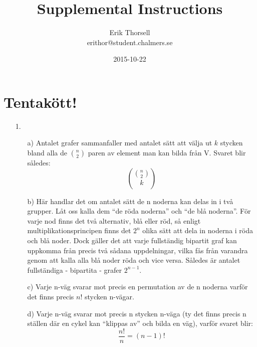 \documentclass{article}
\title{Supplemental Instructions}
\author{Erik Thorsell \\ 
		\small{erithor@student.chalmers.se}
}
\date{2015-10-22}
\begin{document}
\maketitle

\section*{Tentakött!}

\begin{enumerate}

\item[1.]
\begin{itemize}
    \item[a)] Antalet grafer sammanfaller med antalet sätt att välja ut $k$ 
              stycken bland alla de $\binom{n}{2}$ paren av element man kan
              bilda från V. Svaret blir således: $$\binom{\binom{n}{2}}{k}$$
    \item[b)] Här handlar det om antalet sätt de n noderna kan delas in i två
              grupper. Låt oss kalla dem ``de röda noderna'' och ``de blå
              noderna''. För varje nod finns det två alternativ, blå eller röd,
              så enligt multiplikationsprincipen finns det $2^n$ olika sätt att
              dela in noderna i röda och blå noder. Dock gäller det att varje
              fullständig bipartit graf kan uppkomma från precis två sådana
              uppdelningar, vilka fås från varandra genom att kalla alla blå
              noder röda och vice versa. Således är antalet fullständiga -
              bipartita - grafer $2^{n-1}$.
    \item[c)] Varje n-väg svarar mot precis en permutation av de n noderna
              varför det finns precis $n!$ stycken n-vägar.
    \item[d)] Varje n-väg svarar mot precis n stycken n-väga (ty det finns
              precis n ställen där en cykel kan ``klippas av'' och bilda en
              väg), varför svaret blir: $$\frac{n!}{n} = (n-1)!$$\\
\end{itemize}


\end{enumerate}
\end{document}

